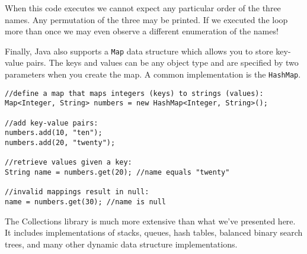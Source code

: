 When this code executes we cannot expect any particular order of
the three names.  Any permutation of the three may be printed.  If
we executed the loop more than once we may even observe a different
enumeration of the names!

Finally, Java also supports a \texttt{Map} data structure
which allows you to store key-value pairs.  The keys and values
can be any object type and are specified by two parameters when
you create the map.  A common implementation is the \texttt{HashMap}.

\begin{verbatim}
//define a map that maps integers (keys) to strings (values):
Map<Integer, String> numbers = new HashMap<Integer, String>();

//add key-value pairs:
numbers.add(10, "ten");
numbers.add(20, "twenty");

//retrieve values given a key:
String name = numbers.get(20); //name equals "twenty"

//invalid mappings result in null:
name = numbers.get(30); //name is null
\end{verbatim}

The Collections library is much more extensive than what we've 
presented here.  It includes implementations of stacks, queues, 
hash tables, balanced 
binary search trees, and many other dynamic data structure 
implementations.
